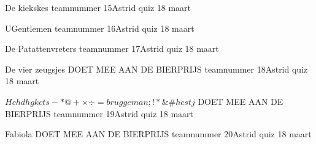 \documentclass{exam}
\begin{document}
\begin{landscape}
\newpage

\vspace*{\fill}
\centering\LARGE{De kiekskes\linebreak
teamnummer 15\linebreak Astrid quiz 18 maart}
\vspace*{\fill}



\newpage

\vspace*{\fill}
\centering\LARGE{UGentlemen\linebreak
teamnummer 16\linebreak Astrid quiz 18 maart}
\vspace*{\fill}



\newpage

\vspace*{\fill}
\centering\LARGE{De Patattenvreters\linebreak
teamnummer 17\linebreak Astrid quiz 18 maart}
\vspace*{\fill}


\newpage

\vspace*{\fill}
\centering\LARGE{De vier zeugsjes\linebreak
DOET MEE AAN DE BIERPRIJS\linebreak
teamnummer 18\linebreak Astrid quiz 18 maart}
\vspace*{\fill}


\newpage

\vspace*{\fill}
\centering\LARGE{$Hchdhgkcts-*@+\times\div=bruggeman;!*\&\#hcstj$\linebreak
DOET MEE AAN DE BIERPRIJS\linebreak
teamnummer 19\linebreak Astrid quiz 18 maart}
\vspace*{\fill}


\newpage

\vspace*{\fill}
\centering\LARGE{Fabiola\linebreak
DOET MEE AAN DE BIERPRIJS\linebreak
teamnummer 20\linebreak Astrid quiz 18 maart}
\vspace*{\fill}


\newpage


\end{landscape}
\end{document}
